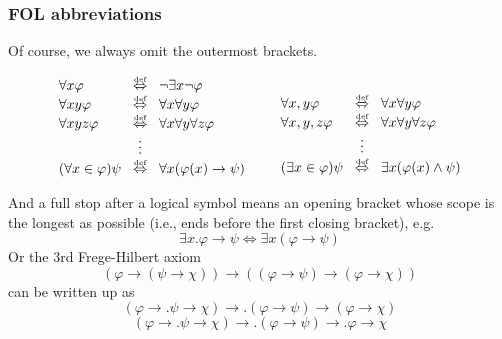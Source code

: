\documentclass[xcolor=x11names]{beamer}
\newcommand{\defekv}[1][.1]{\hspace{#1cm}\overset{\textup{\tiny def}}{ \Leftrightarrow }\hspace{#1cm}}
\newcommand{\lthen}{\rightarrow}
\newcommand{\forallin}[2]{(\forall #1 \in #2)}
\newcommand{\existsin}[2]{(\exists #1 \in #2)}
\newenvironment{tomb}[2][.1]{\arraycolsep=#1cm\begin{array}{#2}}{\end{array}}
\begin{document}
\begin{frame}
	\frametitle{FOL abbreviations}
\footnotesize
Of course, we always omit the outermost brackets.

\[\begin{tomb}{lcll}
   \forall x \varphi &\defekv& \lnot \exists x \lnot \varphi
\\ \forall xy \varphi &\defekv& \forall x \forall y \varphi
\\ \forall xyz \varphi &\defekv& \forall x \forall y \forall z\varphi
\\ & \vdots
\\ \forallin x \varphi \psi &\defekv& \forall x (\varphi (x) \lthen \psi)
\end{tomb}
\qquad \begin{tomb}{lcll}
\\ \forall x,y \varphi &\defekv& \forall x \forall y \varphi
\\ \forall x,y,z \varphi &\defekv& \forall x \forall y \forall z\varphi
\\ & \vdots
\\ \existsin x \varphi \psi &\defekv& \exists x (\varphi (x) \land \psi)
\end{tomb}\]

And a full stop after a logical symbol means an opening bracket whose scope is the longest as possible (i.e., ends before the first closing bracket), e.g.
\[\exists x. \varphi \lthen \psi \iff \exists x (\varphi \lthen \psi)\]
Or the 3rd Frege-Hilbert axiom
\[(\varphi \lthen (\psi \lthen \chi)) \lthen ((\varphi \lthen \psi) \lthen (\varphi \lthen \chi))\]
can be written up as
\[(\varphi \lthen. \psi \lthen \chi) \lthen. (\varphi \lthen \psi) \lthen (\varphi \lthen \chi)\]
\[(\varphi \lthen. \psi \lthen \chi) \lthen. (\varphi \lthen \psi) \lthen. \varphi \lthen \chi\]

\end{frame}
\end{document}
